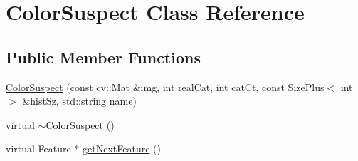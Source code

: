 \hypertarget{class_color_suspect}{\section{\-Color\-Suspect \-Class \-Reference}
\label{class_color_suspect}
}
\subsection*{\-Public \-Member \-Functions}
\begin{DoxyCompactItemize}
\item 
\hyperlink{class_color_suspect_afbbbbd9c577ff42ecada23b497a451cb}{\-Color\-Suspect} (const cv\-::\-Mat \&img, int real\-Cat, int cat\-Ct, const \-Size\-Plus$<$ int $>$ \&hist\-Sz, std\-::string name)
\item 
virtual \hyperlink{class_color_suspect_acd02132c6855e7a8f63ddd8b5d790996}{$\sim$\-Color\-Suspect} ()
\item 
virtual \-Feature $\ast$ \hyperlink{class_color_suspect_ae9d514be897435ac42d73a7aed5bf855}{get\-Next\-Feature} ()
\end{DoxyCompactItemize}


